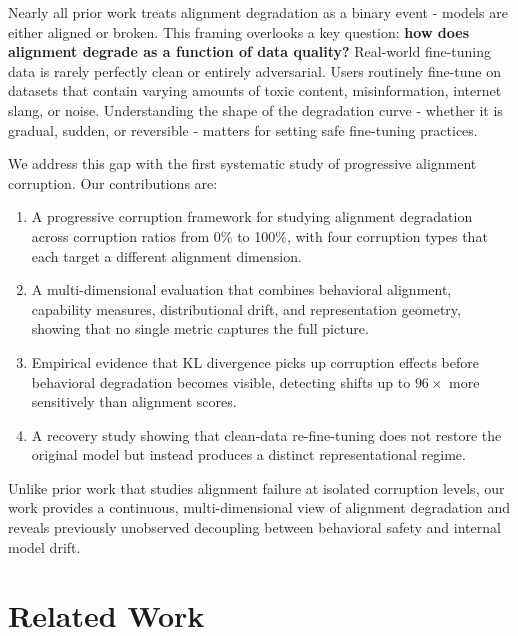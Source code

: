 \documentclass[conference]{IEEEtran}
\begin{document}
Nearly all prior work treats alignment degradation as a binary event - models are either aligned or broken. This framing overlooks a key question: \textbf{how does alignment degrade as a function of data quality?} Real-world fine-tuning data is rarely perfectly clean or entirely adversarial. Users routinely fine-tune on datasets that contain varying amounts of toxic content, misinformation, internet slang, or noise. Understanding the shape of the degradation curve - whether it is gradual, sudden, or reversible - matters for setting safe fine-tuning practices.

We address this gap with the first systematic study of progressive alignment corruption. Our contributions are:

\begin{enumerate}
    \item A progressive corruption framework for studying alignment degradation across corruption ratios from 0\% to 100\%, with four corruption types that each target a different alignment dimension.
    \item A multi-dimensional evaluation that combines behavioral alignment, capability measures, distributional drift, and representation geometry, showing that no single metric captures the full picture.
    \item Empirical evidence that KL divergence picks up corruption effects before behavioral degradation becomes visible, detecting shifts up to $96\times$ more sensitively than alignment scores.
    \item A recovery study showing that clean-data re-fine-tuning does not restore the original model but instead produces a distinct representational regime.
\end{enumerate}

Unlike prior work that studies alignment failure at isolated corruption levels, our work provides a continuous, multi-dimensional view of alignment degradation and reveals previously unobserved decoupling between behavioral safety and internal model drift.

\section{Related Work}
\label{sec:related}
\end{document}
